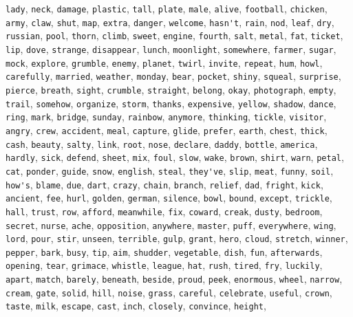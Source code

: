 \verb|lady|, \verb|neck|, \verb|damage|, \verb|plastic|, \verb|tall|, \verb|plate|, \verb|male|, \verb|alive|, \verb|football|, \verb|chicken|, \verb|army|, \verb|claw|, \verb|shut|, \verb|map|, \verb|extra|, \verb|danger|, \verb|welcome|, \verb|hasn't|, \verb|rain|, \verb|nod|, \verb|leaf|, \verb|dry|, \verb|russian|, \verb|pool|, \verb|thorn|, \verb|climb|, \verb|sweet|, \verb|engine|, \verb|fourth|, \verb|salt|, \verb|metal|, \verb|fat|, \verb|ticket|, \verb|lip|, \verb|dove|, \verb|strange|, \verb|disappear|, \verb|lunch|, \verb|moonlight|, \verb|somewhere|, \verb|farmer|, \verb|sugar|, \verb|mock|, \verb|explore|, \verb|grumble|, \verb|enemy|, \verb|planet|, \verb|twirl|, \verb|invite|, \verb|repeat|, \verb|hum|, \verb|howl|, \verb|carefully|, \verb|married|, \verb|weather|, \verb|monday|, \verb|bear|, \verb|pocket|, \verb|shiny|, \verb|squeal|, \verb|surprise|, \verb|pierce|, \verb|breath|, \verb|sight|, \verb|crumble|, \verb|straight|, \verb|belong|, \verb|okay|, \verb|photograph|, \verb|empty|, \verb|trail|, \verb|somehow|, \verb|organize|, \verb|storm|, \verb|thanks|, \verb|expensive|, \verb|yellow|, \verb|shadow|, \verb|dance|, \verb|ring|, \verb|mark|, \verb|bridge|, \verb|sunday|, \verb|rainbow|, \verb|anymore|, \verb|thinking|, \verb|tickle|, \verb|visitor|, \verb|angry|, \verb|crew|, \verb|accident|, \verb|meal|, \verb|capture|, \verb|glide|, \verb|prefer|, \verb|earth|, \verb|chest|, \verb|thick|, \verb|cash|, \verb|beauty|, \verb|salty|, \verb|link|, \verb|root|, \verb|nose|, \verb|declare|, \verb|daddy|, \verb|bottle|, \verb|america|, \verb|hardly|, \verb|sick|, \verb|defend|, \verb|sheet|, \verb|mix|, \verb|foul|, \verb|slow|, \verb|wake|, \verb|brown|, \verb|shirt|, \verb|warn|, \verb|petal|, \verb|cat|, \verb|ponder|, \verb|guide|, \verb|snow|, \verb|english|, \verb|steal|, \verb|they've|, \verb|slip|, \verb|meat|, \verb|funny|, \verb|soil|, \verb|how's|, \verb|blame|, \verb|due|, \verb|dart|, \verb|crazy|, \verb|chain|, \verb|branch|, \verb|relief|, \verb|dad|, \verb|fright|, \verb|kick|, \verb|ancient|, \verb|fee|, \verb|hurl|, \verb|golden|, \verb|german|, \verb|silence|, \verb|bowl|, \verb|bound|, \verb|except|, \verb|trickle|, \verb|hall|, \verb|trust|, \verb|row|, \verb|afford|, \verb|meanwhile|, \verb|fix|, \verb|coward|, \verb|creak|, \verb|dusty|, \verb|bedroom|, \verb|secret|, \verb|nurse|, \verb|ache|, \verb|opposition|, \verb|anywhere|, \verb|master|, \verb|puff|, \verb|everywhere|, \verb|wing|, \verb|lord|, \verb|pour|, \verb|stir|, \verb|unseen|, \verb|terrible|, \verb|gulp|, \verb|grant|, \verb|hero|, \verb|cloud|, \verb|stretch|, \verb|winner|, \verb|pepper|, \verb|bark|, \verb|busy|, \verb|tip|, \verb|aim|, \verb|shudder|, \verb|vegetable|, \verb|dish|, \verb|fun|, \verb|afterwards|, \verb|opening|, \verb|tear|, \verb|grimace|, \verb|whistle|, \verb|league|, \verb|hat|, \verb|rush|, \verb|tired|, \verb|fry|, \verb|luckily|, \verb|apart|, \verb|match|, \verb|barely|, \verb|beneath|, \verb|beside|, \verb|proud|, \verb|peek|, \verb|enormous|, \verb|wheel|, \verb|narrow|, \verb|cream|, \verb|gate|, \verb|solid|, \verb|hill|, \verb|noise|, \verb|grass|, \verb|careful|, \verb|celebrate|, \verb|useful|, \verb|crown|, \verb|taste|, \verb|milk|, \verb|escape|, \verb|cast|, \verb|inch|, \verb|closely|, \verb|convince|, \verb|height|, 